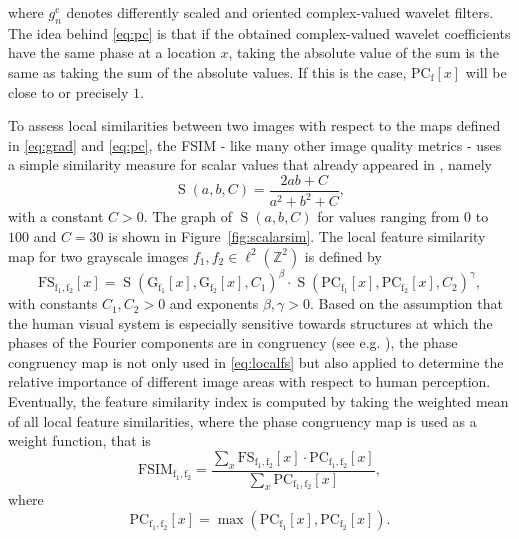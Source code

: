 \documentclass[11pt,a4paper]{article}
\newcommand{\bZ}{\mathbb{Z}}
\newcommand{\Sim}{\operatorname{S}}
\begin{document}
where $g^\text{c}_n$ denotes differently scaled and oriented complex-valued wavelet filters. The idea behind \eqref{eq:pc} is that if the obtained complex-valued wavelet coefficients have the same phase at a location $x$, taking the absolute value of the sum is the same as taking the sum of the absolute values. If this is the case, $\operatorname{PC_{f}}[x]$ will be close to or precisely $1$. 

To assess local similarities between two images with respect to the maps defined in \eqref{eq:grad} and \eqref{eq:pc}, the FSIM - like many other image quality metrics - uses a simple similarity measure for scalar values that already appeared in \cite{WBSS2004}, namely
\begin{equation}
\label{eq:scalarsim}
\Sim(a,b,C) = \frac{2ab + C}{a^2 + b^2 + C},
\end{equation}
with a constant $C > 0$. The graph of $\Sim(a,b,C)$ for values ranging from $0$ to $100$ and $C=30$ is shown in Figure~\ref{fig:scalarsim}. The local feature similarity map for two grayscale images $f_1,f_2\in\ell^2(\bZ^2)$ is defined by
\setlength{\arraycolsep}{0.0em}
\begin{equation}
\label{eq:localfs}
\operatorname{FS_{f_1,f_2}}[x]= \Sim\left(\operatorname{G_{f_1}}[x],\operatorname{G_{f_2}}[x],C_1\right)^\beta {\cdot} \Sim\left(\operatorname{PC_{f_1}}[x],\operatorname{PC_{f_2}}[x],C_2\right)^\gamma,
\end{equation}
\setlength{\arraycolsep}{5pt}
with constants $C_1,C_2>0$ and exponents $\beta,\gamma > 0$. Based on the assumption that the human visual system is especially sensitive towards structures at which the phases of the Fourier components are in congruency (see e.g. \cite{MRBO1986}), the phase congruency map is not only used in \eqref{eq:localfs} but also applied to determine the relative importance of different image areas with respect to human perception. Eventually, the feature similarity index is computed by taking the weighted mean of all local feature similarities, where the phase congruency map is used as a weight function, that is
\begin{equation}
\label{eq:fsim}
\operatorname{FSIM_{f_1,f_2}} = \frac{\sum_x \operatorname{FS_{f_1,f_2}}[x]  \cdot \operatorname{PC_{f_1,f_2}}[x]}{\sum_x \operatorname{PC_{f_1,f_2}}[x]},
\end{equation}
where
\begin{equation}
\operatorname{PC_{f_1,f_2}}[x] = \max\left(\operatorname{PC_{f_1}}[x],\operatorname{PC_{f_2}}[x]\right).
\end{equation}
\end{document}
